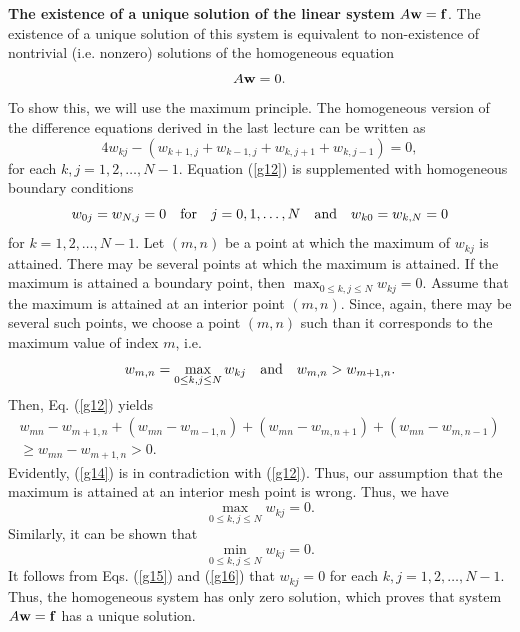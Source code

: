 {\bf The existence of a unique solution of the linear system} $A{\bf w}={\bf f}$.
The existence of a unique solution of this system is equivalent to non-existence of nontrivial
(i.e. nonzero) solutions of the homogeneous equation
\[
A{\bf w}=0.
\]
To show this, we will use the maximum principle. The homogeneous version of the difference equations
derived in the last lecture can be written as
\begin{equation}
4w_{kj}-\left(w_{k+1,j}+w_{k-1,j}+w_{k,j+1}+w_{k,j-1}\right)
=0, \label{g12}
\end{equation}
for each $k,j=1,2,\dots,N-1$.  Equation (\ref{g12}) is supplemented with homogeneous
boundary conditions
\begin{equation}
w_{0j}=w_{N,j}=0 \quad \hbox{for} \quad j=0,1,\dots,N \quad \hbox{and} \quad
w_{k0}=w_{k,N}=0\label{g13}
\end{equation}
for $k=1,2,\dots,N-1$.
Let $(m,n)$ be a point at which the maximum of $w_{kj}$ is attained. There may be several points at
which the maximum is attained. If the maximum is attained a boundary point, then
$\max_{0\leq k,j\leq N}w_{kj}=0$.
Assume that the maximum is attained at an interior point $(m,n)$. Since, again,
there may be several such points, we choose a point $(m,n)$ such than
it corresponds to the maximum value of index $m$, i.e.
\[
w_{m,n}=\max_{0\leq k,j\leq N}w_{kj} \quad \hbox{and} \quad
w_{m,n}>w_{m+1,n}.
\]
Then, Eq. (\ref{g12}) yields
\begin{multline}
w_{mn}-w_{m+1,n}+(w_{mn}-w_{m-1,n})+(w_{mn}-w_{m,n+1})+(w_{mn}-w_{m,n-1})\\
\geq w_{mn}-w_{m+1,n} > 0. \label{g14}
\end{multline}
Evidently, (\ref{g14}) is in contradiction with (\ref{g12}). Thus, our assumption that the maximum
is attained at an interior mesh point is wrong. Thus, we have
\begin{equation}
\max_{0\leq k,j\leq N}w_{kj}=0. \label{g15}
\end{equation}
Similarly, it can be shown that
\begin{equation}
\min_{0\leq k,j\leq N}w_{kj}=0. \label{g16}
\end{equation}
It follows from Eqs. (\ref{g15}) and (\ref{g16}) that $w_{kj}=0$ for
each $k,j=1,2,\dots,N-1$. Thus, the homogeneous system has only
zero solution, which proves that system $A{\bf w}={\bf f}$ has a unique
solution.


